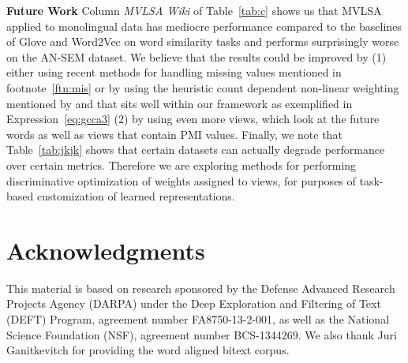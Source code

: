 \documentclass[11pt]{article}
\begin{document}
\noindent\textbf{Future Work} Column \emph{MVLSA Wiki} of
Table~\ref{tab:c} shows us that MVLSA applied to monolingual data has
 mediocre performance  compared to the baselines of Glove and
Word2Vec on word similarity tasks and performs surprisingly worse on
the AN-SEM dataset. We believe that the results could be improved by (1)
either using recent methods for handling missing values
mentioned in footnote~\ref{ftn:mis} or by using the heuristic count dependent
non-linear weighting mentioned by 
and that sits well within our framework as exemplified in Expression~\ref{eq:gcca3}
 (2) by using even more views, which
look at the future words as well as views that contain PMI values.
Finally, we note that Table~\ref{tab:jkjk} shows that certain datasets can
actually degrade performance over certain metrics. Therefore we are
exploring methods for performing discriminative optimization of weights
assigned to views, for purposes of task-based customization of learned representations.


\section*{Acknowledgments}
This material is based on research sponsored by the Defense Advanced
Research Projects Agency (DARPA) under the Deep Exploration and
Filtering of Text (DEFT) Program, agreement number FA8750-13-2-001, as
well as the National Science Foundation (NSF), agreement number
\mbox{BCS-1344269}.  We also thank Juri Ganitkevitch for providing the word
aligned bitext corpus.



\end{document}
